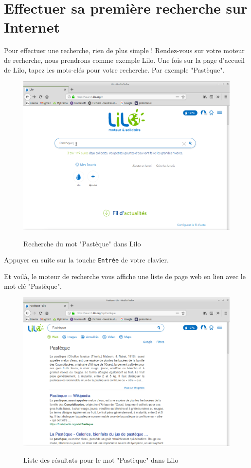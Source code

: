 \documentclass[12pt]{book}
\begin{document}
	\section{Effectuer sa première recherche sur Internet}
	Pour effectuer une recherche, rien de plus simple ! 
	Rendez-vous sur votre moteur de recherche, nous prendrons comme exemple Lilo.
	Une fois sur la page d'accueil de Lilo, tapez les mots-clés pour votre recherche.
	Par exemple "Pastèque".
	\begin{figure}[h]
		\centering
		\includegraphics[scale=0.3]{include/pasteque1.png}
		\label{fig:pasteque1}
		\caption{Recherche du mot "Pastèque" dans Lilo}
	\end{figure}
	Appuyer en suite sur la touche \texttt{Entrée} de votre clavier.\par
	Et voilà, le moteur de recherche vous affiche une liste de page web en lien avec le mot clé "Pastèque".
	\begin{figure}[h]
		\centering
		\includegraphics[scale=0.3]{include/pasteque2.png}
		\label{fig:pasteque2}
		\caption{Liste des résultats pour le mot "Pastèque" dans Lilo}
	\end{figure}
\end{document}
